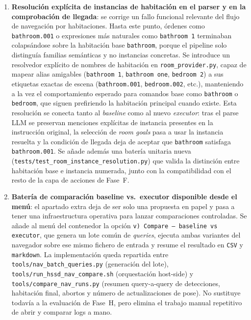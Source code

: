 \documentclass[11pt,a4paper]{article}
\begin{document}
\begin{enumerate}
  \item \textbf{Resolución explícita de instancias de habitación en el parser y
        en la comprobación de llegada}: se corrige un fallo funcional relevante
        del flujo de navegación por habitaciones. Hasta este punto, órdenes como
        \texttt{bathroom.001} o expresiones más naturales como
        \texttt{bathroom 1} terminaban colapsándose sobre la habitación base
        \texttt{bathroom}, porque el pipeline solo distinguía familias
        semánticas y no instancias concretas. Se introduce un resolvedor
        explícito de nombres de habitación en \texttt{room\_provider.py}, capaz
        de mapear alias amigables
        (\texttt{bathroom 1}, \texttt{bathroom one}, \texttt{bedroom 2}) a sus
        etiquetas exactas de escena (\texttt{bathroom.001},
        \texttt{bedroom.002}, etc.), manteniendo a la vez el comportamiento
        esperado para comandos base como \texttt{bathroom} o \texttt{bedroom},
        que siguen prefiriendo la habitación principal cuando existe. Esta
        resolución se conecta tanto al \emph{baseline} como al nuevo
        \emph{executor}: tras el parse LLM se preservan menciones explícitas de
        instancia presentes en la instrucción original, la selección de
        \emph{room goals} pasa a usar la instancia resuelta y la condición de
        llegada deja de aceptar que \texttt{bathroom} satisfaga
        \texttt{bathroom.001}. Se añade además una batería unitaria nueva
        (\texttt{tests/test\_room\_instance\_resolution.py}) que valida la
        distinción entre habitación base e instancia numerada, junto con la
        compatibilidad con el resto de la capa de acciones de Fase~F.

  \item \textbf{Batería de comparación baseline vs.\ executor disponible desde
        el menú}: el apartado extra deja de ser solo una propuesta en papel y
        pasa a tener una infraestructura operativa para lanzar comparaciones
        controladas. Se añade al menú del contenedor la opción
        \texttt{v) Compare --- baseline vs executor}, que genera un lote común
        de \emph{queries}, ejecuta ambas variantes del navegador sobre ese mismo
        fichero de entrada y resume el resultado en \texttt{CSV} y
        \texttt{markdown}. La implementación queda repartida entre
        \texttt{tools/nav\_batch\_queries.py} (generación del lote),
        \texttt{tools/run\_hssd\_nav\_compare.sh} (orquestación host-side) y
        \texttt{tools/compare\_nav\_runs.py} (resumen query-a-query de
        detecciones, habitación final, abortos y número de actualizaciones de
        pose). No sustituye todavía a la evaluación de Fase~H, pero elimina el
        trabajo manual repetitivo de abrir y comparar logs a mano.


\end{enumerate}
\end{document}

